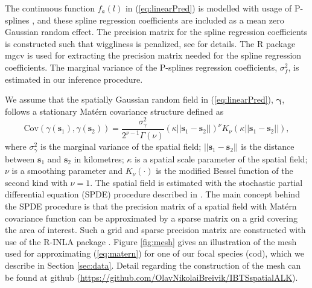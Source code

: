 \documentclass[a4paper 12pt]{article}
\numberwithin{equation}{section}
\newcommand{\nat}[1]{\textcolor{blue}{#1}}
\begin{document}
 The continuous function $f_a(l)$ in (\ref{eq:linearPred}) is modelled with usage of P-splines \citep{wood2017generalized}, and these spline regression coefficients are included as a mean zero Gaussian random effect. The precision matrix for the spline regression coefficients is constructed such that wiggliness is penalized, see \citet[page 239]{wood2017generalized} for details. The R package mgcv \citep{wood2015package} is used for extracting the precision matrix needed for the spline regression coefficients. The marginal variance of the P-splines regression coefficients, $\sigma_f^2$, is estimated in our inference procedure.

We assume that the spatially Gaussian random field in (\ref{eq:linearPred}), $\pmb{\gamma}$, follows a stationary Mat\'{e}rn covariance structure defined as
\begin{equation}\label{eq:matern}
 \text{Cov}(\gamma(\mathbf{s}_1),\gamma(\mathbf{s}_2)) = \frac{\sigma^2_{\gamma}}{2^{\nu-1}\Gamma(\nu)}(\kappa||\mathbf{s}_1 -\mathbf{s}_2||)^{\nu}K_{\nu}(\kappa||\mathbf{s}_1-\mathbf{s}_2||),
\end{equation}
where $\sigma^2_{\gamma}$ is the marginal variance of the spatial field; $||\mathbf{s}_1-\mathbf{s}_2||$ is the distance between $\mathbf{s}_1$ and $\mathbf{s}_2$ in kilometres; $\kappa$ is a spatial scale parameter of the spatial field; $\nu$ is a smoothing parameter and $K_{\nu}(\cdot)$ is the modified Bessel function of the second kind with $\nu = 1$.  The spatial field is estimated with the stochastic partial differential equation (SPDE) procedure described in \citet{lindgren2011explicit}. The main concept behind the SPDE procedure is that the precision matrix of a spatial field with Mat\'{e}rn  covariance function can be approximated by a sparse matrix on a grid covering the area of interest. Such a grid and sparse precision matrix are constructed with use of the R-INLA package \citep{rue2009approximate}. Figure \ref{fig:mesh} gives an illustration of the mesh used for approximating  (\ref{eq:matern}) for one of our focal species (cod), which we describe in Section \ref{sec:data}. Detail regarding the construction of the mesh can be found at github (\href{https://github.com/OlavNikolaiBreivik/IBTSspatialALK}{https://github.com/OlavNikolaiBreivik/IBTSspatialALK}).
\end{document}
